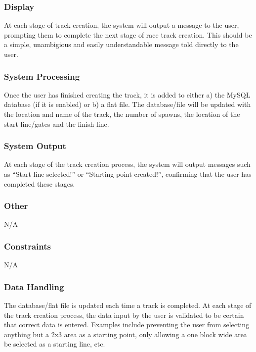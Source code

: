 \documentclass[a4paper, 11pt]{article} %
\begin{document}
\subsubsection{Display}

At each stage of track creation, the system will output a message to the user, prompting them to complete the next stage of race track creation. This should be a simple, unambigious and easily understandable message told directly to the user.

\subsubsection{System Processing}

Once the user has finished creating the track, it is added to either a) the MySQL database (if it is enabled) or b) a flat file. The database/file will be updated with the location and name of the track, the number of spawns, the location of the start line/gates and the finish line.

\subsubsection{System Output}

At each stage of the track creation process, the system will output messages such as ``Start line selected!'' or ``Starting point created!'', confirming that the user has completed these stages.

\subsubsection{Other}

N/A

\subsubsection{Constraints}

N/A

\subsubsection{Data Handling}

The database/flat file is updated each time a track is completed. At each stage of the track creation process, the data input by the user is validated to be certain that correct data is entered. Examples include preventing the user from selecting anything but a 2x3 area as a starting point, only allowing a one block wide area be selected as a starting line, etc.
\end{document}
